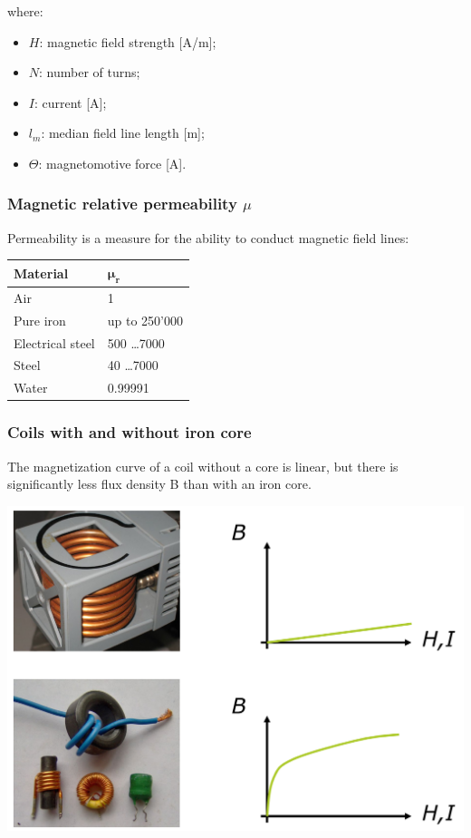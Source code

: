 \documentclass{article}
\begin{document}

where:
\begin{itemize}
    \item $H$: magnetic field strength [A/m];
    \item $N$: number of turns;
    \item $I$: current [A];
    \item $l_{m}$: median field line length [m];
    \item $\Theta$: magnetomotive force [A].
\end{itemize}

\subsubsection{Magnetic relative permeability $\mu$}
Permeability is a measure for the ability to conduct magnetic field lines:

\begin{center}
    \begin{tabular}{|l|l|}
        \hline
        \textbf{Material} & $\mathbf{\mu_r}$ \\
        \hline
        Air & 1 \\
        Pure iron & up to 250'000 \\
        Electrical steel & 500 \ldots 7000 \\
        Steel & 40 \ldots 7000 \\
        Water & 0.99991 \\
        \hline
    \end{tabular}
\end{center}

\newpage
\subsubsection{Coils with and without iron core}
The magnetization curve of a coil without a core
is linear, but there is significantly less flux
density B than with an iron core.
\begin{center}
    \includegraphics[width=.7\textwidth]{media/iron_coils.png}
\end{center}
\end{document}

